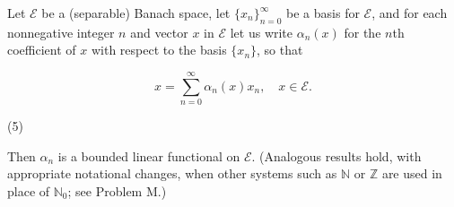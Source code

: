 Let $\mathcal{E}$ be a (separable) Banach space, let $\{x_n\}_{n=0}^{\infty}$ be a basis for $\mathcal{E}$, and for each nonnegative integer $n$ and vector $x$ in $\mathcal{E}$ let us write $\alpha_n(x)$ for the $n$th coefficient of $x$ with respect to the basis $\{x_n\}$, so that

$$x = \sum_{n=0}^{\infty} \alpha_n(x)x_n, \quad x \in \mathcal{E}.$$

(5)

Then $\alpha_n$ is a bounded linear functional on $\mathcal{E}$. (Analogous results hold, with appropriate notational changes, when other systems such as $\mathbb{N}$ or $\mathbb{Z}$ are used in place of $\mathbb{N}_0$; see Problem M.)
